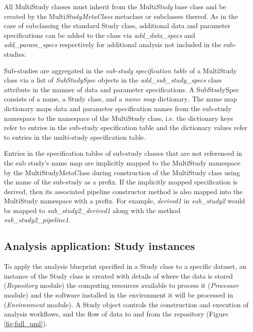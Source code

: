 \documentclass[smallextended]{svjour3}       %
\begin{document}
All MultiStudy classes must inherit from the Multi\emph{Study} base
class and be created by the Multi\emph{StudyMetaClass} metaclass or
subclasses thereof. As in the case of subclassing the standard Study
class, additional data and parameter specifications can be added to the
class via \emph{add\_data\_specs} and \emph{add\_param\_specs}
respectively for additional analysis not included in the sub-studies.

Sub-studies are aggregated in the \emph{sub-study} \emph{specification
table} of a MultiStudy class via a list of \emph{SubStudySpec} objects
in the \emph{add\_sub\_study\_specs} class attribute in the manner of
data and parameter specifications. A SubStudySpec consists of a name, a
Study class, and a \emph{name map} dictionary\emph{.} The name map
dictionary maps data and parameter specification names from the
sub-study namespace to the namespace of the MultiStudy class, i.e.
the dictionary keys refer to entries in the sub-study specification table and
the dictionary values refer to entries in the multi-study specification table.

Entries in the specification tables of sub-study classes that are not
referenced in the sub study's name map are implicitly mapped to the
MultiStudy namespace by the MultiStudyMetaClass during construction of the
MultiStudy class using the name of the sub-study as a prefix.
If the implicitly mapped specification is derived, then its associated pipeline
constructor method is also mapped into the MultiStudy namespace with a prefix.
For example, \emph{derived1} in \emph{sub\_study2} would be mapped to
\emph{sub\_study2\_derived1} along with the method
\emph{sub\_study2\_pipeline1}.

\subsection*{Analysis application: Study instances}
\label{analysis-application-study-instances}

To apply the analysis blueprint specified in a Study class to a specific
dataset, an instance of the Study class is created with details of where
the data is stored (\emph{Repository} module) the computing
resources available to process it (\emph{Processor} module) and the software
installed in the environment it will be processed in (\emph{Environment} module).
A Study object controls the construction and execution of analysis workflows,
and the flow of data to and from the repository (Figure \ref{fig:full_uml}).
\end{document}
